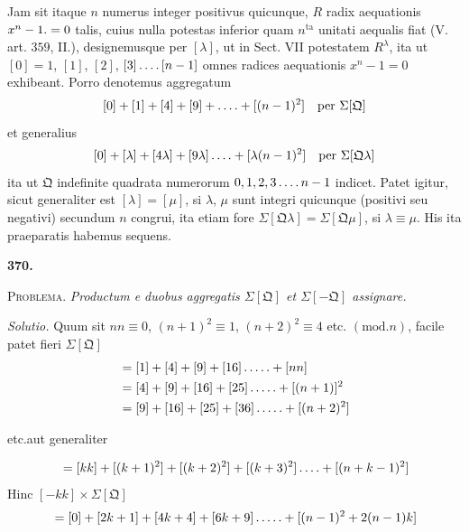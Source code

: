 Jam sit itaque $n$ numerus integer positivus quicunque, $R$ radix aequationis $x^n-1\mathbin{.}=0$ talis, cuius nulla potestas inferior quam $n^{\mathrm{ta}}$ unitati aequalis fiat (V. art. $359$, II.), designemusque per $[\lambda]$, ut in Sect. VII potestatem $R^\lambda$, ita ut $[0]=1$, $[1]$, $[2]$, $[3]\mathinner{.\,.\,.\,.}[n-1]$ omnes radices aequationis $x^n-1=0$ exhibeant. Porro denotemus aggregatum
\[
{}[0]+[1]+[4]+[9]+\mathinner{.\,.\,.\,.}+[(n-1)^2]\quad\text{per }\Sigma[\mathfrak{Q}]
\]
et generalius
\[
{}[0]+[\lambda]+[4\lambda]+[9\lambda]\mathinner{.\,.\,.\,.}+[\lambda(n-1)^2]\quad\text{per }\Sigma[\mathfrak{Q}\lambda]
\]
ita ut $\mathfrak{Q}$ indefinite quadrata numerorum $0,1,2,3\mathinner{.\,.\,.\,.} n-1$ indicet. Patet igitur, sicut generaliter est $[\lambda]=[\mu]$, si $\lambda$, $\mu$ sunt integri quicunque (positivi seu negativi) secundum $n$ congrui, ita etiam fore $\Sigma[\mathfrak{Q}\lambda]=\Sigma[\mathfrak{Q}\mu]$, si $\lambda\equiv\mu$. His ita praeparatis habemus sequens.
\par\medskip{}\centerline{\textbf{370.}}\nobreak\smallskip
\textsc{Problema.} \textit{Productum e duobus aggregatis $\Sigma[\mathfrak{Q}]$ et $\Sigma[-\mathfrak{Q}]$ assignare.}
\par\noindent\textit{Solutio.} Quum sit $nn\equiv0$, $(n+1)^2\equiv1$, $(n+2)^2\equiv4$ etc. $(\mathrm{mod}.n)$, facile patet fieri $\Sigma[\mathfrak{Q}]$
\[
\begin{aligned}
&=[1]+[4]+[9]+[16]\mathinner{.\,.\,.\,.\,.}+[nn]\\
&=[4]+[9]+[16]+[25]\mathinner{.\,.\,.\,.\,.}+[(n+1)]^2\\
&=[9]+[16]+[25]+[36]\mathinner{.\,.\,.\,.\,.}+[(n+2)^2]
\end{aligned}
\]
\centerline{etc.\quad aut generaliter}
\[
{}=[kk]+[(k+1)^2]+[(k+2)^2]+[(k+3)^2]\mathinner{.\,.\,.\,.}+[(n+k-1)^2]
\]
Hinc $[-kk]\times\Sigma[\mathfrak{Q}]$
\[
{}=[0]+[2k+1]+[4k+4]+[6k+9]\mathinner{.\,.\,.\,.\,.}+[(n-1)^2+2(n-1)k]
\]
